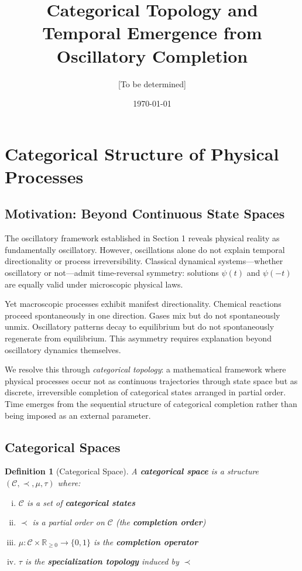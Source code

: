 \documentclass[11pt]{article}
\title{Categorical Topology and Temporal Emergence from Oscillatory Completion}
\author{[To be determined]}
\date{\today}
\newtheorem{definition}[theorem]{Definition}
\theoremstyle{remark}
\begin{document}
\maketitle

\section{Categorical Structure of Physical Processes}

\subsection{Motivation: Beyond Continuous State Spaces}

The oscillatory framework established in Section 1 reveals physical reality as fundamentally oscillatory. However, oscillations alone do not explain temporal directionality or process irreversibility. Classical dynamical systems—whether oscillatory or not—admit time-reversal symmetry: solutions $\psi(t)$ and $\psi(-t)$ are equally valid under microscopic physical laws.

Yet macroscopic processes exhibit manifest directionality. Chemical reactions proceed spontaneously in one direction. Gases mix but do not spontaneously unmix. Oscillatory patterns decay to equilibrium but do not spontaneously regenerate from equilibrium. This asymmetry requires explanation beyond oscillatory dynamics themselves.

We resolve this through \textit{categorical topology}: a mathematical framework where physical processes occur not as continuous trajectories through state space but as discrete, irreversible completion of categorical states arranged in partial order. Time emerges from the sequential structure of categorical completion rather than being imposed as an external parameter.

\subsection{Categorical Spaces}

\begin{definition}[Categorical Space]
\label{def:categorical_space}
A \textbf{categorical space} is a structure $(\mathcal{C}, \prec, \mu, \tau)$ where:
\begin{enumerate}[(i)]
\item $\mathcal{C}$ is a set of \textbf{categorical states}
\item $\prec$ is a partial order on $\mathcal{C}$ (the \textbf{completion order})
\item $\mu: \mathcal{C} \times \mathbb{R}_{\geq 0} \to \{0, 1\}$ is the \textbf{completion operator}
\item $\tau$ is the \textbf{specialization topology} induced by $\prec$
\end{enumerate}
\end{definition}
\end{document}
